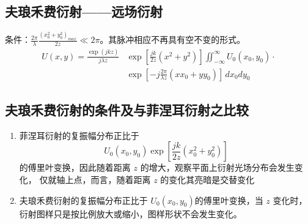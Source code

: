 \documentclass[twocolumn]{ctexart}
\begin{document}
\subsection{夫琅禾费衍射——远场衍射}
条件：$\frac{2\pi}{\lambda}\frac{\left(x_0^2+y_0^2\right)_{max}}{2z}\ll 2\pi$。其脉冲相应不再具有空不变的形式。
\begin{equation}
    \begin{aligned}
        U\left(x,y\right)=\frac{\exp \left(jkz\right)}{j\lambda z} & \exp \left[\frac{jk}{2z}\left(x^2+y^2\right)\right]\iint ^\infty _{-\infty} U_0\left(x_0,y_0\right)\cdot \\
                                                                   & \exp \left[-j\frac{2\pi}{\lambda z}\left(xx_0+yy_0\right)\right]\,dx_0dy_0
    \end{aligned}
    \nonumber
\end{equation}
\subsection{夫琅禾费衍射的条件及与菲涅耳衍射之比较}
\begin{enumerate}
    \item 菲涅耳衍射的复振幅分布正比于
    \begin{equation}
        U_0\left(x_0,y_0\right)\exp \left[\frac{jk}{2z}\left(x_0^2+y_0^2\right)\right]
        \nonumber
    \end{equation}
    的傅里叶变换，因此随着距离 $z$ 的增大，观察平面上衍射光场分布会发生变化，
    仅就轴上点，而言，随着距离 $z$ 的变化其亮暗是交替变化
    \item 夫琅禾费衍射的复振幅分布正比于 $U_0\left(x_0,y_0\right)$的傅里叶变换，当 $z$ 变化时，
    衍射图样只是按比例放大或缩小，图样形状不会发生变化。
\end{enumerate}
\end{document}

